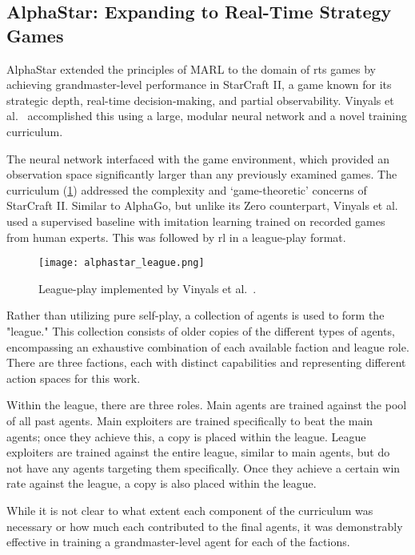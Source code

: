     \subsection*{AlphaStar: Expanding to Real-Time Strategy Games}

AlphaStar extended the principles of MARL to the domain of \gls{rts} 
games by achieving grandmaster-level performance in StarCraft II, 
a game known for its strategic depth, real-time decision-making, 
and partial observability. Vinyals et al.~\cite{vinyals2019} accomplished 
this using a large, modular neural network and a novel training curriculum.

The neural network interfaced with the game environment, which provided an 
observation space significantly larger than any previously examined games. 
The curriculum (\cref{fig:alphastar_league}) addressed the complexity 
and `game-theoretic' concerns of StarCraft II. Similar to AlphaGo, 
but unlike its Zero counterpart, Vinyals et al. used a supervised baseline 
with imitation learning trained on recorded games from human experts. 
This was followed by \gls{rl} in a league-play format.

\begin{figure}[t]
    \centering
    \texttt{[image: alphastar\_league.png]}
    \caption{League-play implemented by Vinyals et al.~\cite{vinyals2019}.}
    \label{fig:alphastar_league}
\end{figure}

Rather than utilizing pure self-play, a collection of agents is used 
to form the "league." This collection consists of older copies of the 
different types of agents, encompassing an exhaustive combination of 
each available faction and league role. There are three factions, 
each with distinct capabilities and representing different action 
spaces for this work.

Within the league, there are three roles. Main agents are trained 
against the pool of all past agents. Main exploiters are trained 
specifically to beat the main agents; once they achieve this, 
a copy is placed within the league. League exploiters are trained 
against the entire league, similar to main agents, but do not have 
any agents targeting them specifically. Once they achieve a certain 
win rate against the league, a copy is also placed within the league.

While it is not clear to what extent each component of the curriculum 
was necessary or how much each contributed to the final agents, 
it was demonstrably effective in training a grandmaster-level 
agent for each of the factions.

